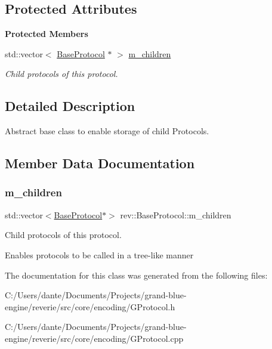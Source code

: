 \subsection*{Protected Attributes}
\begin{Indent}\textbf{ Protected Members}\par
\begin{DoxyCompactItemize}
\item 
std\+::vector$<$ \mbox{\hyperlink{classrev_1_1_base_protocol}{Base\+Protocol}} $\ast$ $>$ \mbox{\hyperlink{classrev_1_1_base_protocol_aaca4c68e141ae64b83dcf1b7d6797b3c}{m\+\_\+children}}
\begin{DoxyCompactList}\small\item\em Child protocols of this protocol. \end{DoxyCompactList}\end{DoxyCompactItemize}
\end{Indent}


\subsection{Detailed Description}
Abstract base class to enable storage of child Protocols. 

\subsection{Member Data Documentation}
\mbox{\label{classrev_1_1_base_protocol_aaca4c68e141ae64b83dcf1b7d6797b3c}} 
\subsubsection{\texorpdfstring{m\_children}{m\_children}}
{\footnotesize\ttfamily std\+::vector$<$\mbox{\hyperlink{classrev_1_1_base_protocol}{Base\+Protocol}}$\ast$$>$ rev\+::\+Base\+Protocol\+::m\+\_\+children\hspace{0.3cm}{\ttfamily [protected]}}



Child protocols of this protocol. 

Enables protocols to be called in a tree-\/like manner 

The documentation for this class was generated from the following files\+:\begin{DoxyCompactItemize}
\item 
C\+:/\+Users/dante/\+Documents/\+Projects/grand-\/blue-\/engine/reverie/src/core/encoding/G\+Protocol.\+h\item 
C\+:/\+Users/dante/\+Documents/\+Projects/grand-\/blue-\/engine/reverie/src/core/encoding/G\+Protocol.\+cpp\end{DoxyCompactItemize}

